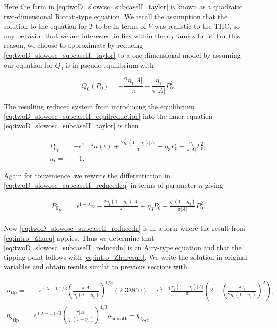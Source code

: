 Here the form in \eqref{eq:twoD_slowosc_subcaseII_taylor} is known as a quadratic two-dimensional Riccati-type equation. We recall the assumption that the solution to the equation for $T$ to be in terms of $V$ was realistic to the THC, so any behavior that we are interested in lies within the dynamics for $V$. For this reason, we choose to approximate by reducing \eqref{eq:twoD_slowosc_subcaseII_taylor} to a one-dimensional model by assuming our equation for $Q_0$ is in pseudo-equilibrium with 

\begin{equation}\label{eq:twoD_slowosc_subcaseII_equilreduction}
{Q_0}(P_0) = -\frac{2\eta_1|A|}{\pi}-\frac{\eta_1}{\pi|A|}P_0^2.
\end{equation}

The resulting reduced system from introducing the equilibrium \eqref{eq:twoD_slowosc_subcaseII_equilreduction} into the inner equation \eqref{eq:twoD_slowosc_subcaseII_taylor} is then

\begin{equation}\label{eq:twoD_slowosc_subcaseII_reducedeq}
\begin{aligned}
{P_0}_t =& -\epsilon^{1-\lambda}n(t)+\frac{2\eta_1(1-\eta_3)|A|}{\pi}-\eta_3P_0+\frac{\eta_1}{\pi|A|}P_0^2,\\
n_t=&-1.
\end{aligned}
\end{equation}

Again for convenience, we rewrite the differentiation in \eqref{eq:twoD_slowosc_subcaseII_reducedeq} in terms of parameter $n$ giving 

\begin{equation} \label{eq:twoD_slowosc_subcaseII_reducedn}
\begin{aligned}
{P_0}_n =& \epsilon^{1-\lambda} n -\frac{2\eta_1(1-\eta_3)|A|}{\pi}+\eta_3 P_0-\frac{\eta_1(1-\eta_3)}{\pi|A|}P_0^2.\\
\end{aligned}
\end{equation}

Now \eqref{eq:twoD_slowosc_subcaseII_reducedn} is in a form where the result from \eqref{eq:intro_Zhueq} applies. Thus we determine that \eqref{eq:twoD_slowosc_subcaseII_reducedn} is an Airy-type equation and that the tipping point follows with \eqref{eq:intro_Zhuresult}. We write the solution in original variables and obtain results similar to previous sections with

\begin{equation}\label{eq:twoD_slowosc_subcaseII_tipping}
\begin{aligned}
n_{\text{tip}} =& -\epsilon^{(\lambda-1)/3}\left(\frac{\pi|A|}{\eta_1(1-\eta_3)}\right)^{1/3}(2.33810)+\epsilon^{\lambda-1}\frac{\eta_1(1-\eta_3)|A|}{\pi}\left(2-\left(\frac{\pi\eta_3}{2\eta_1(1-\eta_3)}\right)^2\right),\\
{\eta_2}_{\text{tip}} =& \epsilon^{(\lambda-1)/3}\left(\frac{\pi|A|}{\eta_1(1-\eta_3)}\right)^{1/3}\mu_{\text{smooth}}+{\eta_2}_{\text{osc}}
\end{aligned}
\end{equation}

